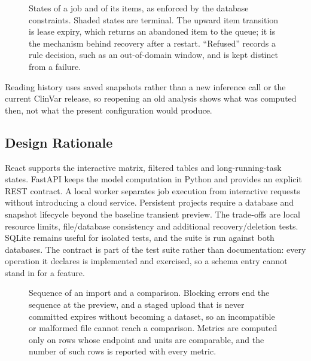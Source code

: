 \begin{figure}[htbp]
  \centering
  
  \caption[States of a job and of its items]{States of a job and of its items, as enforced by the database constraints. Shaded states
  are terminal. The upward item transition is lease expiry, which returns an abandoned item to the
  queue; it is the mechanism behind recovery after a restart. ``Refused'' records a rule decision,
  such as an out-of-domain window, and is kept distinct from a failure.}
  \label{fig:app-job-states}
\end{figure}


Reading history uses saved snapshots rather than a new inference call or the current ClinVar release,
so reopening an old analysis shows what was computed then, not what the present configuration would
produce.

\subsection{Design Rationale}
React supports the interactive matrix, filtered tables and long-running-task states. FastAPI keeps the
model computation in Python and provides an explicit REST contract. A local worker separates job
execution from interactive requests without introducing a cloud service. Persistent projects require
a database and snapshot lifecycle beyond the baseline transient preview. The trade-offs are local
resource limits, file/database consistency and additional recovery/deletion tests. SQLite remains
useful for isolated tests, and the suite is run against both databases. The contract is part of the
test suite rather than documentation: every operation it declares is implemented and exercised, so a
schema entry cannot stand in for a feature.

\begin{figure}[htbp]
  \centering
  
  \caption[Sequence of an import and a comparison]{Sequence of an import and a comparison. Blocking errors end the sequence at the preview, and a
  staged upload that is never committed expires without becoming a dataset, so an incompatible or
  malformed file cannot reach a comparison. Metrics are computed only on rows whose
  endpoint and units are comparable, and the number of such rows is reported with every metric.}
  \label{fig:app-import-sequence}
\end{figure}


